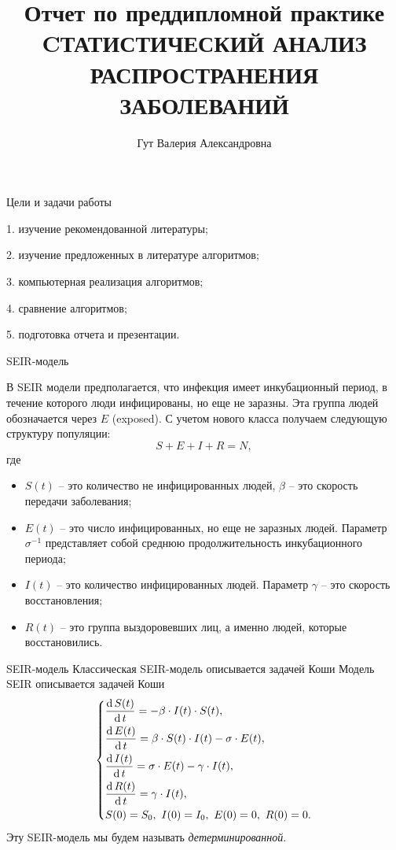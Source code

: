 \documentclass[notheorems]{beamer}
\title[Модели распространения заболеваний]{Отчет по преддипломной практике \\ \Large CТАТИСТИЧЕСКИЙ АНАЛИЗ РАСПРОСТРАНЕНИЯ ЗАБОЛЕВАНИЙ}
\author[В. А. Гут]{Гут Валерия Александровна}
\institute[]{Научный руководитель: С.В. Лобач}
\date[]{}%
\renewcommand{\d}{\operatorname{d}}
\begin{document}
\begin{frame}[plain]
  \titlepage
\end{frame}


\begin{frame}{Цели и задачи работы}

1. изучение рекомендованной литературы;

2. изучение предложенных в литературе алгоритмов;

3. компьютерная реализация алгоритмов;

4. сравнение алгоритмов;

5. подготовка отчета и презентации.


\end{frame}



\begin{frame}
	{SEIR-модель}
	\small{В SEIR модели предполагается, что инфекция имеет инкубационный период, в течение которого люди инфицированы, но
	еще не заразны. Эта группа людей обозначается через $E$ (exposed). С учетом нового класса получаем следующую структуру
	популяции:
	$$S + E + I + R = N,$$ где
	\begin{itemize}
		\item $S(t)$ -- это количество не инфицированных людей, $\beta$ -- это скорость передачи заболевания;
		\item $E(t)$ -- это число инфицированных, но еще не заразных людей.  Параметр $\sigma^{-1}$ представляет собой среднюю продолжительность инкубационного периода;
		\item $I(t)$ -- это количество инфицированных людей. Параметр $\gamma$ -- это скорость восстановления;
		\item $R(t)$ -- это группа выздоровевших лиц, а именно людей, которые восстановились.
	\end{itemize}
}
\end{frame}



\begin{frame}
	{SEIR-модель}
	Классическая SEIR-модель описывается задачей Коши
	Модель SEIR описывается задачей Коши
	\begin{equation*}
		\begin{dcases}
			\dfrac {\d S(t)}{\d t} = - \beta \cdot I(t)\cdot S(t),\\
			\dfrac {\d E(t)}{\d t} = \beta \cdot S(t)\cdot I(t) - \sigma\cdot E(t),\\
			\dfrac{\d I(t)}{\d t} =\sigma \cdot E(t) - \gamma\cdot I(t),\\
			\dfrac{\d R(t)}{\d t} = \gamma\cdot I(t),\\
			S(0) = S_0,\ I(0) = I_0,\ E(0) = 0,\ R(0) = 0.
		\end{dcases}
	\end{equation*}
	Эту SEIR-модель мы будем называть \textit{детерминированной}.
\end{frame}
\end{document}
